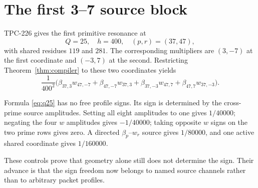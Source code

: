 \section{The first 3--7 source block}

TPC-226 gives the first primitive resonance at
\[
 Q=25,\quad h=400,\quad (p,r)=(37,47),
\]
with shared residues $119$ and $281$.  The corresponding multipliers are
$(3,-7)$ at the first coordinate and $(-3,7)$ at the second.  Restricting
Theorem~\ref{thm:compiler} to these two coordinates yields
\begin{equation}
 \frac1{400^2}\bigl(
 \beta_{37,3}w_{47,-7}+\beta_{47,-7}w_{37,3}
 +\beta_{37,-3}w_{47,7}+\beta_{47,7}w_{37,-3}
 \bigr).
 \label{eq:q25}
\end{equation}

Formula \eqref{eq:q25} has no free profile signs.  Its sign is determined by the
cross-prime source amplitudes.  Setting all eight amplitudes to one gives $1/40000$;
negating the four $w$ amplitudes gives $-1/40000$; taking opposite $w$ signs on the two
prime rows gives zero.  A directed $\beta_p$--$w_r$ source gives $1/80000$, and one
active shared coordinate gives $1/160000$.

These controls prove that geometry alone still does not determine the sign.  Their
advance is that the sign freedom now belongs to named source channels rather than to
arbitrary packet profiles.
